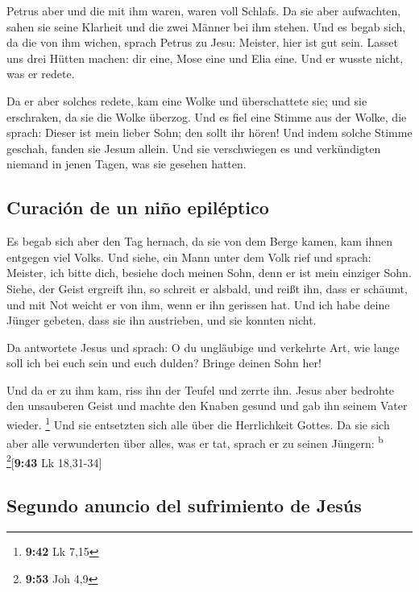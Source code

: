  Petrus aber und die mit ihm waren, waren voll Schlafs.
Da sie aber aufwachten, sahen sie seine Klarheit und die zwei Männer bei
ihm stehen.  Und es begab sich, da die von ihm wichen,
sprach Petrus zu Jesu: Meister, hier ist gut sein. Lasset uns drei
Hütten machen: dir eine, Mose eine und Elia eine. Und er wusste nicht,
was er redete.

 Da er aber solches redete, kam eine Wolke und
überschattete sie; und sie erschraken, da sie die Wolke überzog.
 Und es fiel eine Stimme aus der Wolke, die sprach:
Dieser ist mein lieber Sohn; den sollt ihr hören!  Und
indem solche Stimme geschah, fanden sie Jesum allein. Und sie
verschwiegen es und verkündigten niemand in jenen Tagen, was sie gesehen
hatten.

\hypertarget{curaciuxf3n-de-un-niuxf1o-epiluxe9ptico}{%
\subsection{Curación de un niño
epiléptico}\label{curaciuxf3n-de-un-niuxf1o-epiluxe9ptico}}

 Es begab sich aber den Tag hernach, da sie von dem Berge
kamen, kam ihnen entgegen viel Volks.  Und siehe, ein
Mann unter dem Volk rief und sprach: Meister, ich bitte dich, besiehe
doch meinen Sohn, denn er ist mein einziger Sohn.  Siehe,
der Geist ergreift ihn, so schreit er alsbald, und reißt ihn, dass er
schäumt, und mit Not weicht er von ihm, wenn er ihn gerissen hat.
 Und ich habe deine Jünger gebeten, dass sie ihn
austrieben, und sie konnten nicht.

 Da antwortete Jesus und sprach: O du ungläubige und
verkehrte Art, wie lange soll ich bei euch sein und euch dulden? Bringe
deinen Sohn her!

 Und da er zu ihm kam, riss ihn der Teufel und zerrte
ihn. Jesus aber bedrohte den unsauberen Geist und machte den Knaben
gesund und gab ihn seinem Vater wieder. \footnote{\textbf{9:42} Lk 7,15}
 Und sie entsetzten sich alle über die Herrlichkeit
Gottes. Da sie sich aber alle verwunderten über alles, was er tat,
sprach er zu seinen Jüngern: \textsuperscript{b}
\footnote{\textbf{9:53} Joh 4,9}{[}\textbf{9:43} Lk 18,31-34{]}

\hypertarget{segundo-anuncio-del-sufrimiento-de-jesuxfas}{%
\subsection{Segundo anuncio del sufrimiento de
Jesús}\label{segundo-anuncio-del-sufrimiento-de-jesuxfas}}

